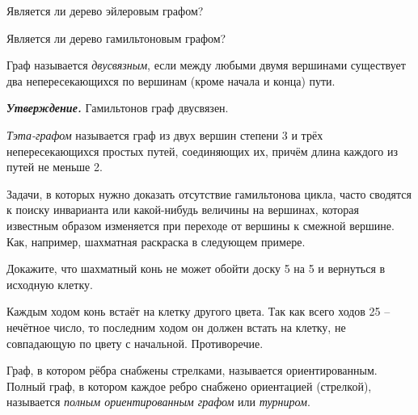 \newpage

\begin{ques}
    Является ли дерево эйлеровым графом?
\end{ques}

\begin{ques}
    Является ли дерево гамильтоновым графом?
\end{ques}

\begin{dfn}
    Граф называется \textit{двусвязным}, если между любыми двумя вершинами существует два непересекающихся по вершинам (кроме начала и конца) пути.
\end{dfn}

\textit{\textbf{Утверждение.}} Гамильтонов граф двусвязен.

\begin{dfn}
    \textit{Тэта-графом} называется граф из двух вершин степени 3 и трёх непересекающихся простых путей, соединяющих их, причём длина каждого из путей не меньше 2.
\end{dfn}


Задачи, в которых нужно доказать отсутствие гамильтонова цикла, часто сводятся к поиску инварианта или какой-нибудь величины на вершинах, которая известным образом изменяется при переходе от вершины к смежной вершине. Как, например, шахматная раскраска в следующем примере.

\begin{thm}
    Докажите, что шахматный конь не может обойти доску 5 на 5 и вернуться в исходную клетку.
\end{thm}

\begin{prf}
    Каждым ходом конь встаёт на клетку другого цвета. Так как всего ходов 25 -- нечётное число, то последним ходом он должен встать на клетку, не совпадающую по цвету с начальной. Противоречие.
\end{prf}

\begin{dfn}
    Граф, в котором рёбра снабжены стрелками, называется ориентированным. Полный граф, в котором каждое ребро снабжено ориентацией (стрелкой), называется \textit{полным ориентированным графом }или \textit{турниром}.
\end{dfn}

